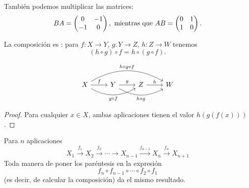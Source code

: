 \begin{ejemplo}
\begin{center}
  \end{center}

  También podemos multiplicar las matrices:
  \[ BA = \begin{pmatrix} 0 & -1 \\ -1 & 0 \end{pmatrix},
    \text{ mientras que }
    AB = \begin{pmatrix} 0 & 1 \\ 1 & 0 \end{pmatrix}. \qedhere \]
\end{ejemplo}

\begin{observacion}
  \label{obs:composicion-de-aplicaciones-asociativa}
  La composición es : para $f\colon X\to Y$,
  $g\colon Y\to Z$, $h\colon Z\to W$ tenemos
  $$(h\circ g)\circ f = h\circ (g\circ f).$$

  \[ \begin{tikzcd}
      X \ar{r}{f}\ar[bend right]{rr}[swap]{g\circ f}\ar[bend left]{rrr}{h\circ g\circ f} & Y \ar{r}{g}\ar[bend right]{rr}[swap]{h\circ g} & Z \ar{r}{h} & W
    \end{tikzcd} \]

  \begin{proof}
    Para cualquier $x\in X$, ambas aplicaciones tienen el valor $h (g (f (x)))$.
  \end{proof}
\end{observacion}

\begin{corolario}
  \label{corr:asociatividad-generalizada-para-composiciones}
  Para $n$ aplicaciones
  $$X_1 \xrightarrow{f_1} X_2 \xrightarrow{f_2} \cdots \to X_{n-1} \xrightarrow{f_{n-1}} X_n \xrightarrow{f_n} X_{n+1}$$
  Toda manera de poner los paréntesis en la expresión
  $$f_n\circ f_{n-1}\circ\cdots\circ f_2\circ f_1$$
  (es decir, de calcular la composición) da el mismo resultado.
\end{corolario}

